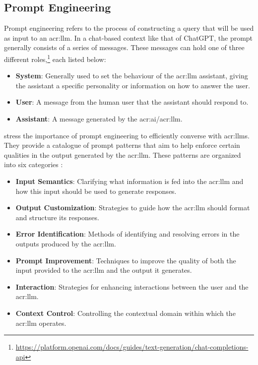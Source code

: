 \subsection{Prompt Engineering}
\label{subsec:prompt-engineering}

Prompt engineering refers to the process of constructing a query that will be used as input to an \acrshort{acr:llm}. In a chat-based context like that of ChatGPT, the prompt generally consists of a series of messages. These messages can hold one of three different roles,\footnote{\url{https://platform.openai.com/docs/guides/text-generation/chat-completions-api}} each listed below:

\begin{itemize}
    \item \textbf{System}: Generally used to set the behaviour of the \acrshort{acr:llm} assistant, giving the assistant a specific personality or information on how to answer the user.
    \item \textbf{User}: A message from the human user that the assistant should respond to.
    \item \textbf{Assistant}: A message generated by the \acrshort{acr:ai}/\acrshort{acr:llm}.
\end{itemize}

\cite{whitePromptPatternCatalog2023a} stress the importance of prompt engineering to efficiently converse with \glspl{acr:llm}. They provide a catalogue of prompt patterns that aim to help enforce certain qualities in the output generated by the \gls{acr:llm}. These patterns are organized into six categories \citep[4]{whitePromptPatternCatalog2023a}:

\begin{itemize}
    \item \textbf{Input Semantics}: Clarifying what information is fed into the \acrshort{acr:llm} and how this input should be used to generate responses.
    \item \textbf{Output Customization}: Strategies to guide how the \acrshort{acr:llm} should format and structure its responses.
    \item \textbf{Error Identification}: Methods of identifying and resolving errors in the outputs produced by the \acrshort{acr:llm}.
    \item \textbf{Prompt Improvement}: Techniques to improve the quality of both the input provided to the \acrshort{acr:llm} and the output it generates.
    \item \textbf{Interaction}: Strategies for enhancing interactions between the user and the \acrshort{acr:llm}.
    \item \textbf{Context Control}: Controlling the contextual domain within which the \acrshort{acr:llm} operates.
\end{itemize}

